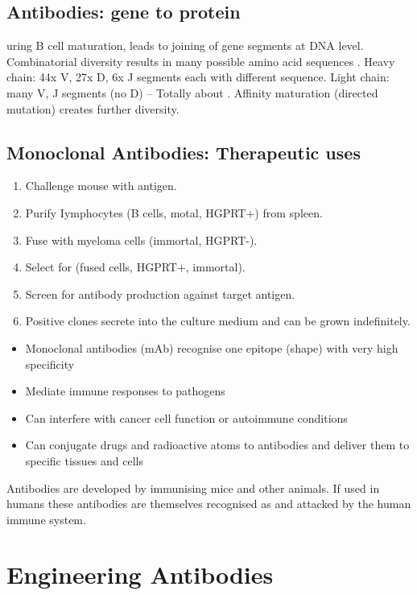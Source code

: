 \subsection{Antibodies: gene to protein}
uring B cell maturation,  leads to joining of gene segments at DNA level. Combinatorial diversity results in many possible amino acid sequences . Heavy chain: 44x V, 27x D, 6x J segments each with different sequence. Light chain: many V, J segments (no D) -- Totally about . Affinity maturation (directed mutation) creates further diversity.
\subsection{Monoclonal Antibodies: Therapeutic uses}
\begin{enumerate}[itemsep=0mm]
    \item Challenge mouse with antigen.
    \item Purify Iymphocytes (B cells, motal, HGPRT+) from spleen.
    \item Fuse with myeloma cells (immortal, HGPRT-).
    \item Select for  (fused cells, HGPRT+, immortal).
    \item Screen for antibody production against target antigen.
    \item Positive clones secrete  into the culture medium and can be grown indefinitely.
\end{enumerate}
\begin{itemize}
    \item Monoclonal antibodies (mAb) recognise one epitope (shape) with very high specificity
    \item Mediate immune responses to pathogens
    \item Can interfere with cancer cell function or autoimmune conditions
    \item Can conjugate drugs and radioactive atoms to antibodies and deliver them to specific tissues and cells
\end{itemize}
Antibodies are developed by immunising mice and other animals. If used in humans these antibodies are themselves recognised as  and attacked by the human immune system.

\section{Engineering Antibodies}
